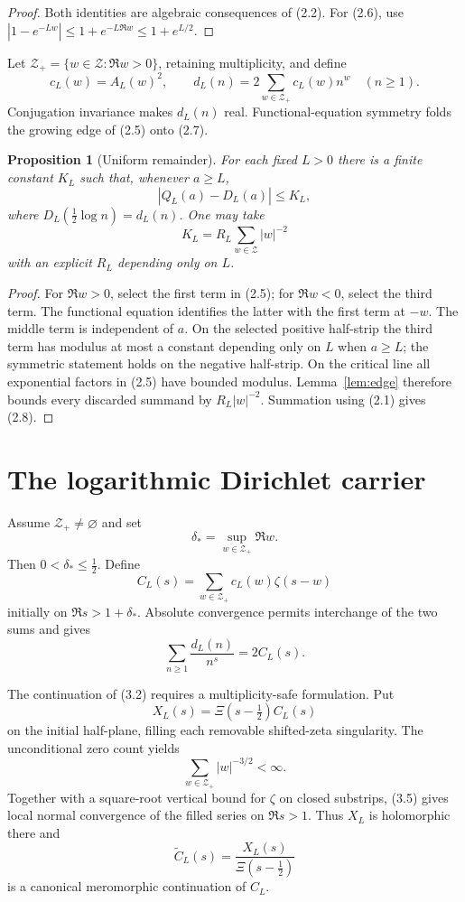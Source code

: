 \documentclass[11pt]{article}
\newtheorem{proposition}[theorem]{Proposition}
\newcommand{\XiR}{\Xi}
\newcommand{\cZ}{\mathcal Z}
\begin{document}
\begin{proof}
Both identities are algebraic consequences of (2.2).  For (2.6), use
$|1-e^{-Lw}|\le1+e^{-L\Re w}\le1+e^{L/2}$.
\end{proof}

Let $\cZ_+=\{w\in\cZ:\Re w>0\}$, retaining multiplicity, and define
\[
  c_L(w)=A_L(w)^2,
  \qquad
  d_L(n)=2\sum_{w\in\cZ_+}c_L(w)n^w
  \quad(n\ge1).
  \tag{2.7}
\]
Conjugation invariance makes $d_L(n)$ real.  Functional-equation symmetry folds the growing edge
of (2.5) onto (2.7).

\begin{proposition}[Uniform remainder]\label{prop:remainder}
For each fixed $L>0$ there is a finite constant $K_L$ such that, whenever
$a\ge L$,
\[
  \left|Q_L(a)-D_L(a)\right|\le K_L,
  \tag{2.8}
\]
where $D_L(\frac12\log n)=d_L(n)$.  One may take
\[
  K_L=R_L\sum_{w\in\cZ}|w|^{-2}
  \tag{2.9}
\]
with an explicit $R_L$ depending only on $L$.
\end{proposition}

\begin{proof}
For $\Re w>0$, select the first term in (2.5); for $\Re w<0$, select the third
term.  The functional equation identifies the latter with the first term at $-w$.  The middle
term is independent of $a$.  On the selected positive half-strip the third term has modulus at
most a constant depending only on $L$ when $a\ge L$; the symmetric statement holds on the
negative half-strip.  On the critical line all exponential factors in (2.5) have bounded modulus.
Lemma~\ref{lem:edge} therefore bounds every discarded summand by $R_L|w|^{-2}$.
Summation using (2.1) gives (2.8).
\end{proof}

\section{The logarithmic Dirichlet carrier}

Assume $\cZ_+\ne\varnothing$ and set
\[
  \delta_* = \sup_{w\in\cZ_+}\Re w.
  \tag{3.1}
\]
Then $0<\delta_*\le\frac12$.  Define
\[
  C_L(s)=\sum_{w\in\cZ_+}c_L(w)\zeta(s-w)
  \tag{3.2}
\]
initially on $\Re s>1+\delta_*$.  Absolute convergence permits interchange of the two sums and
gives
\[
  \sum_{n\ge1}\frac{d_L(n)}{n^s}=2C_L(s).
  \tag{3.3}
\]

The continuation of (3.2) requires a multiplicity-safe formulation.  Put
\[
  X_L(s)=\XiR(s-\tfrac12)C_L(s)
  \tag{3.4}
\]
on the initial half-plane, filling each removable shifted-zeta singularity.  The unconditional
zero count yields
\[
  \sum_{w\in\cZ_+}|w|^{-3/2}<\infty.
  \tag{3.5}
\]
Together with a square-root vertical bound for $\zeta$ on closed substrips, (3.5) gives local
normal convergence of the filled series on $\Re s>1$.  Thus $X_L$ is holomorphic there and
\[
  \widetilde C_L(s)=\frac{X_L(s)}{\XiR(s-\tfrac12)}
  \tag{3.6}
\]
is a canonical meromorphic continuation of $C_L$.
\end{document}
